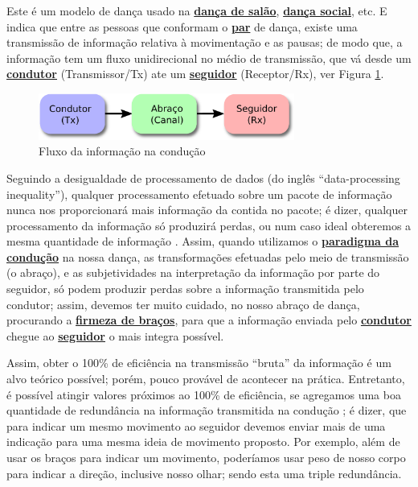 \begin{definition} 
\label{def:ParadigmaConducao} 
Este é um modelo de dança usado na \hyperref[def:DancaSalao]{\textbf{dança de salão}},
\hyperref[def:DancaSocial]{\textbf{dança social}}, etc. 
E indica que entre as pessoas que conformam o \hyperref[def:Par]{\textbf{par}} de dança,
existe uma transmissão de informação relativa à movimentação e as pausas; 
de modo que, a informação tem um fluxo unidirecional no médio de transmissão,
que vá desde um \hyperref[def:Condutor]{\textbf{condutor}} (Transmissor/Tx) 
ate um \hyperref[def:Seguidor]{\textbf{seguidor}} (Receptor/Rx),
ver Figura \ref{fig:paradigmaconducion}. 
\end{definition}

\begin{figure}[!ht]
     \centering
\includegraphics[width=0.75\textwidth]{chapters/cap-normas/modeloconducao.eps}
\caption{Fluxo da informação na condução}
\label{fig:paradigmaconducion}
\end{figure}

Seguindo a desigualdade de processamento de dados (do inglês ``data-processing inequality''),
qualquer processamento efetuado sobre um pacote de informação 
nunca nos proporcionará mais informação da contida no pacote;
é dizer, qualquer processamento da informação só produzirá perdas,
ou num caso ideal obteremos a mesma quantidade de informação  \cite[pp. 34]{cover2006elements}.
Assim, quando utilizamos o \hyperref[def:ParadigmaConducao]{\textbf{paradigma da condução}} na nossa dança,
as transformações efetuadas pelo meio de transmissão (o abraço),
e as subjetividades na interpretação da informação por parte do seguidor, 
só podem produzir perdas sobre a informação transmitida pelo condutor;
assim, devemos ter muito cuidado, no nosso abraço de dança,
procurando a \hyperref[def:brazosfirmes]{\textbf{firmeza de braços}}, 
para que a informação enviada pelo \hyperref[def:Condutor]{\textbf{condutor}} 
chegue ao \hyperref[def:Seguidor]{\textbf{seguidor}} o mais integra possível.

Assim, obter o 100\% de eficiência na transmissão ``bruta'' da informação
é  um alvo teórico possível; porém, pouco provável de acontecer na prática.
Entretanto, é possível atingir valores próximos ao 100\% de eficiência,
se agregamos uma boa quantidade de redundância na informação transmitida na condução \cite[pp. 184,219]{cover2006elements};
é dizer, que para indicar um mesmo movimento ao seguidor devemos enviar mais de uma indicação 
para uma mesma ideia de movimento proposto. Por exemplo, 
além de usar os braços para indicar um movimento, 
poderíamos usar peso de nosso corpo para indicar a direção, inclusive nosso olhar;
sendo esta uma triple redundância.
 

